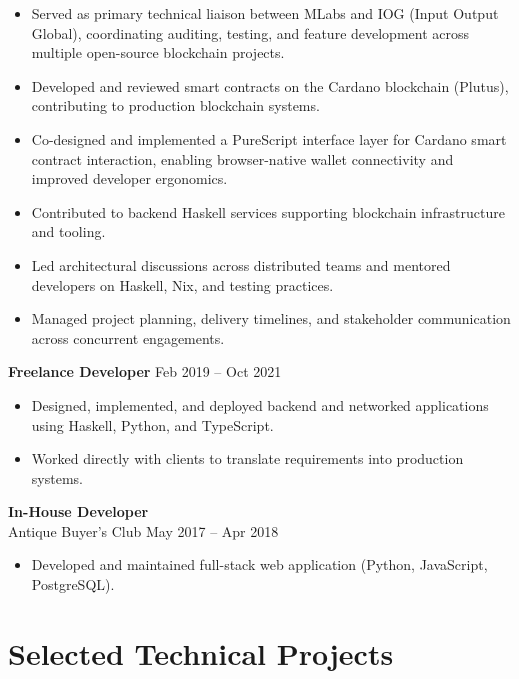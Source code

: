 \documentclass[11pt]{article}
\begin{document}
\begin{itemize}
    \item Served as primary technical liaison between MLabs and IOG (Input Output Global), coordinating auditing, testing, and feature development across multiple open-source blockchain projects.
    \item Developed and reviewed smart contracts on the Cardano blockchain (Plutus), contributing to production blockchain systems.
    \item Co-designed and implemented a PureScript interface layer for Cardano smart contract interaction, enabling browser-native wallet connectivity and improved developer ergonomics.
    \item Contributed to backend Haskell services supporting blockchain infrastructure and tooling.
    \item Led architectural discussions across distributed teams and mentored developers on Haskell, Nix, and testing practices.
    \item Managed project planning, delivery timelines, and stakeholder communication across concurrent engagements.
\end{itemize}

\vspace{6pt}

\textbf{Freelance Developer} \hfill Feb 2019 -- Oct 2021

\begin{itemize}
    \item Designed, implemented, and deployed backend and networked applications using Haskell, Python, and TypeScript.
    \item Worked directly with clients to translate requirements into production systems.
\end{itemize}

\vspace{6pt}

\textbf{In-House Developer} \\
Antique Buyer's Club \hfill May 2017 -- Apr 2018

\begin{itemize}
    \item Developed and maintained full-stack web application (Python, JavaScript, PostgreSQL).
\end{itemize}

\section*{Selected Technical Projects}
\end{document}
